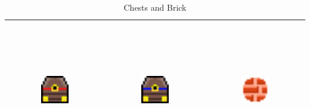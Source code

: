\begin{table}[h!]
    \begin{center}
    \begin{tabular}{ | c | c | c | }
    \hline
    \includegraphics[width=0.3\textwidth, height=60mm]{images/chest_0.png}
    & 
    \includegraphics[width=0.3\textwidth, height=60mm]{images/chest_1.png}    
    & 
    \includegraphics[width=0.3\textwidth, height=60mm]{images/object_brick.png}
    \\
    \hline
    \end{tabular}
    \caption{Chests and Brick}
    \label{tbl:Chests and Brick}
    \end{center}
\end{table}